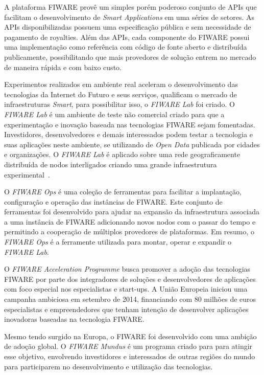 A plataforma FIWARE provê um simples porém poderoso conjunto de APIs que facilitam o desenvolvimento de \textit{Smart Applications}
em uma séries de setores. As APIs disponibilizadas possuem uma especificação pública e sem necessidade de pagamento de royalties.
Além das APIs, cada componente do FIWARE possui uma implementação como referência com código de fonte aberto e distribuída
publicamente, possibilitando que mais provedores de solução entrem no mercado de maneira rápida e com baixo custo.

Experimentos realizados em ambiente real aceleram o desenvolvimento das tecnologias da Internet do Futuro e seus serviços,
qualificam o mercado de infraestruturas \textit{Smart}, para possibilitar isso, o \textit{FIWARE Lab} foi criado.
O \textit{FIWARE Lab} é um ambiente de teste não comercial criado para que a experimentação e inovação baseada nas tecnologias
FIWARE sejam fomentadas. Investidores, desenvolvedores e demais interessados podem testar a tecnologia e suas aplicações neste
ambiente, se utilizando de \textit{Open Data} publicada por cidades e organizações. O \textit{FIWARE Lab} é aplicado sobre
uma rede geograficamente distribuída de nodos interligados criando uma grande infraestrutura experimental~\cite{7027596}.

O \textit{FIWARE Ops} é uma coleção de ferramentas para facilitar a implantação, configuração e operação das instâncias de FIWARE.
Este conjunto de ferramentas foi desenvolvido para ajudar na expansão da infraestrutura associada a uma instância de FIWARE
adicionando novos nodos com o passar do tempo e permitindo a cooperação de múltiplos provedores de plataformas. Em resumo,
o \textit{FIWARE Ops} é a ferramente utilizada para montar, operar e expandir o \textit{FIWARE Lab}.

O \textit{FIWARE Acceleration Programme} busca promover a adoção das tecnologias FIWARE por parte dos integradores de
soluções e desenvolvedores de aplicações com foco especial nos especialistas e start-ups. A União Europeia iniciou uma
campanha ambiciosa em setembro de 2014, financiando com 80 milhões de euros especialistas e empreendedores que tenham
intenção de desenvolver aplicações inovadoras baseadas na tecnologia FIWARE.

Mesmo tendo surgido na Europa, o FIWARE foi desenvolvido com uma ambição de adoção global. O \textit{FIWARE Mundus} é um programa
criado para para atingir esse objetivo, envolvendo investidores e interessados de outras regiões do mundo para participarem
no desenvolvimento e utilização das tecnologias.
